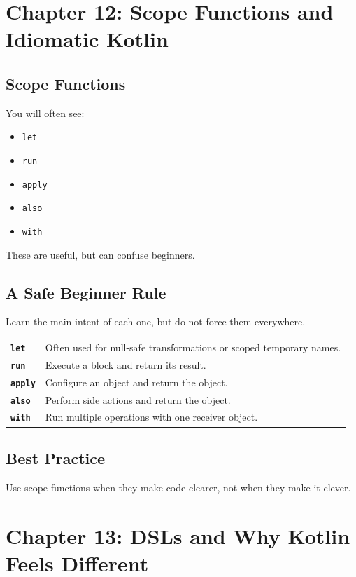 \documentclass[11pt,a4paper]{article}
\begin{document}
\section{Chapter 12: Scope Functions and Idiomatic Kotlin}

\subsection{Scope Functions}

You will often see:
\begin{itemize}
    \item \texttt{let}
    \item \texttt{run}
    \item \texttt{apply}
    \item \texttt{also}
    \item \texttt{with}
\end{itemize}

These are useful, but can confuse beginners.

\subsection{A Safe Beginner Rule}

Learn the main intent of each one, but do not force them everywhere.

\begin{longtable}{p{} p{}}
\textbf{\texttt{let}} & Often used for null-safe transformations or scoped temporary names. \\
\textbf{\texttt{run}} & Execute a block and return its result. \\
\textbf{\texttt{apply}} & Configure an object and return the object. \\
\textbf{\texttt{also}} & Perform side actions and return the object. \\
\textbf{\texttt{with}} & Run multiple operations with one receiver object. \\
\end{longtable}

\subsection{Best Practice}

Use scope functions when they make code clearer, not when they make it clever.

\section{Chapter 13: DSLs and Why Kotlin Feels Different}
\end{document}
